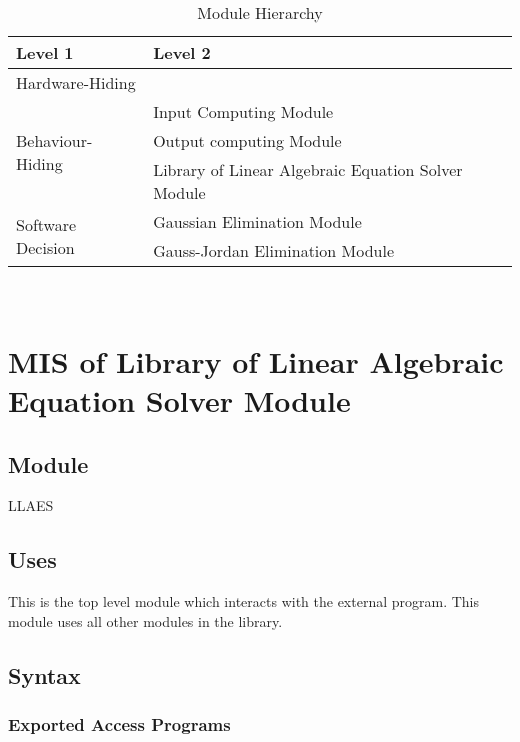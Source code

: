 \documentclass[12pt, titlepage]{article}
\begin{document}
\begin{table}[h!]
\centering
\begin{tabular}{p{} p{}}
\toprule
\textbf{Level 1} & \textbf{Level 2}\\
\midrule

{Hardware-Hiding} & ~ \\
\midrule

\multirow{3}{0.3\textwidth}{Behaviour-Hiding} 
& Input Computing Module\\
& Output computing Module\\
& Library of Linear Algebraic Equation Solver Module\\


\midrule

\multirow{2}{0.3\textwidth}{Software Decision}  & Gaussian Elimination Module\\

& Gauss-Jordan Elimination Module\\


\bottomrule

\end{tabular}
\caption{Module Hierarchy}
\label{TblMH}
\end{table}

\newpage
~\newpage

\section{MIS of {Library of Linear Algebraic Equation Solver Module}} \label{llaem} %

\subsection{Module}

LLAES


\subsection{Uses}
This is the top level module which interacts with the external program. This module uses all other modules in the library. 


\subsection{Syntax}

\subsubsection{Exported Access Programs}
\end{document}
